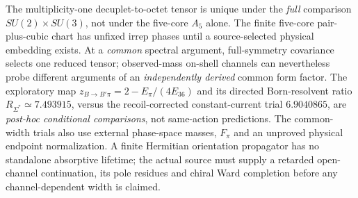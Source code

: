 \documentclass[12pt,a4paper]{article}
\begin{document}
\begin{remark}
\label{p11:rem:v372-mass-decay-trial-scope}
The multiplicity-one decuplet-to-octet tensor is unique under the
\emph{full} comparison $SU(2)\times SU(3)$, not under the
five-core $A_5$ alone. The finite five-core pair-plus-cubic chart
has unfixed irrep phases until a source-selected physical embedding
exists. At a \emph{common} spectral argument, full-symmetry
covariance selects one reduced tensor; observed-mass on-shell
channels can nevertheless probe different arguments of an
\emph{independently derived} common form factor. The exploratory
map $z_{B\to B'\pi}=2-E_\pi/(4E_{36})$ and its directed
Born-resolvent ratio $R_{\Sigma^*}\simeq7.493915$, versus the
recoil-corrected constant-current trial $6.9040865$, are
\emph{post-hoc conditional comparisons}, not same-action predictions.
The common-width trials also use external phase-space masses,
$F_\pi$ and an unproved physical endpoint normalization. A
finite Hermitian orientation propagator has no standalone
absorptive lifetime; the actual source must supply a retarded
open-channel continuation, its pole residues and chiral Ward
completion before any channel-dependent width is claimed.
\end{remark}
\end{document}
